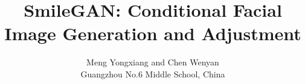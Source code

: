 \documentclass[conference,11pt,a4paper,compsoc,onecolumn,draft]{IEEEtran}
\begin{document}
\title{SmileGAN: Conditional Facial Image Generation and Adjustment}
\author{Meng Yongxiang and Chen Wenyan\\Guangzhou No.6 Middle School, China}

\maketitle
\tableofcontents









\newpage
{}



\end{document}
